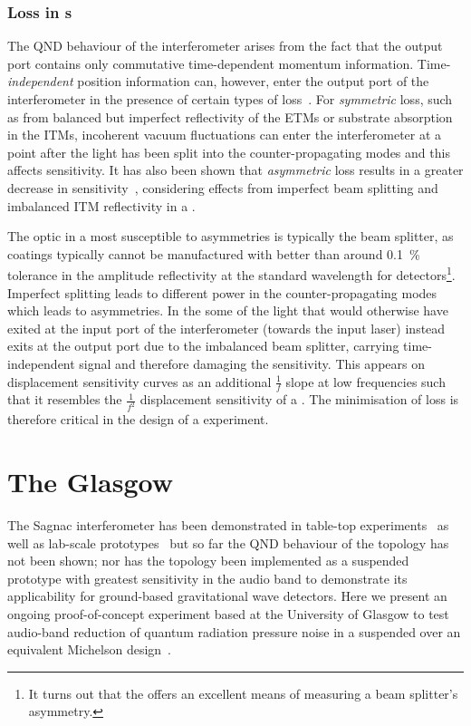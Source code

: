 \subsubsection{Loss in \SSM{}s}
The \gls{QND} behaviour of the interferometer arises from the fact that the output port contains only commutative time-dependent momentum information. Time-\emph{independent} position information can, however, enter the output port of the interferometer in the presence of certain types of loss~\cite{Danilishin2004}. For \emph{symmetric} loss, such as from balanced but imperfect reflectivity of the \glspl{ETM} or substrate absorption in the \glspl{ITM}, incoherent vacuum fluctuations can enter the interferometer at a point after the light has been split into the counter-propagating modes and this affects sensitivity. It has also been shown that \emph{asymmetric} loss results in a greater decrease in sensitivity~\cite{Danilishin2015}, considering effects from imperfect beam splitting and imbalanced \gls{ITM} reflectivity in a \SSM{}.

The optic in a \SSM{} most susceptible to asymmetries is typically the beam splitter, as coatings typically cannot be manufactured with better than around \SI{0.1}{\percent} tolerance in the amplitude reflectivity at the standard wavelength for detectors\footnote{It turns out that the \SSM{} offers an excellent means of measuring a beam splitter's asymmetry.}. Imperfect splitting leads to different power in the counter-propagating modes which leads to asymmetries. In the \SSM{} some of the light that would otherwise have exited at the input port of the interferometer (towards the input laser) instead exits at the output port due to the imbalanced beam splitter, carrying time-independent signal and therefore damaging the sensitivity. This appears on displacement sensitivity curves as an additional $\frac{1}{f}$ slope at low frequencies such that it resembles the $\frac{1}{f^2}$ displacement sensitivity of a \MI{}. The minimisation of loss is therefore critical in the design of a \SSM{} experiment.

\section{The Glasgow \SSMEXPT{}}
The Sagnac interferometer has been demonstrated in table-top experiments~\cite{Shaddock1998} as well as lab-scale prototypes~\cite{Beyersdorf2002, Eberle2010} but so far the \gls{QND} behaviour of the \SSM{} topology has not been shown; nor has the topology been implemented as a suspended prototype with greatest sensitivity in the audio band to demonstrate its applicability for ground-based gravitational wave detectors. Here we present an ongoing proof-of-concept experiment based at the University of Glasgow to test audio-band reduction of quantum radiation pressure noise in a suspended \SSM{} over an equivalent Michelson design~\cite{Graef2014}.

